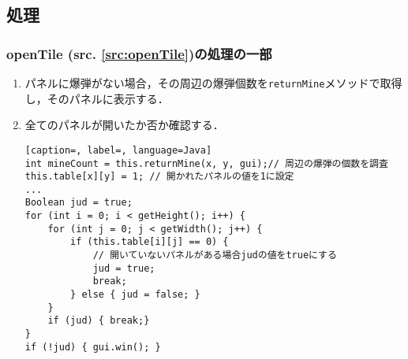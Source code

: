 \documentclass[a4j,11pt]{jsarticle}
\newcommand{\srcref}[1]{src. \ref{#1}}
\newcommand{\met}[1]{\ttfamily #1 \normalfont (\srcref{src:#1})の処理}
\begin{document}
\subsection{処理}\label{sec:openTile}
\subsubsection*{\met{openTile}の一部}
\begin{enumerate}
    \renewcommand{\labelenumi}{\arabic{enumi})}
    \item パネルに爆弾がない場合，その周辺の爆弾個数を\verb|returnMine|メソッドで取得し，そのパネルに表示する．
    \item 全てのパネルが開いたか否か確認する．
          \begin{lstlisting}[caption=, label=, language=Java]
int mineCount = this.returnMine(x, y, gui);// 周辺の爆弾の個数を調査
this.table[x][y] = 1; // 開かれたパネルの値を1に設定
...
Boolean jud = true;
for (int i = 0; i < getHeight(); i++) {
    for (int j = 0; j < getWidth(); j++) {
        if (this.table[i][j] == 0) {
            // 開いていないパネルがある場合judの値をtrueにする
            jud = true;
            break;
        } else { jud = false; }
    }
    if (jud) { break;}
}
if (!jud) { gui.win(); }		
\end{lstlisting}
\end{enumerate}
\newpage
\end{document}
